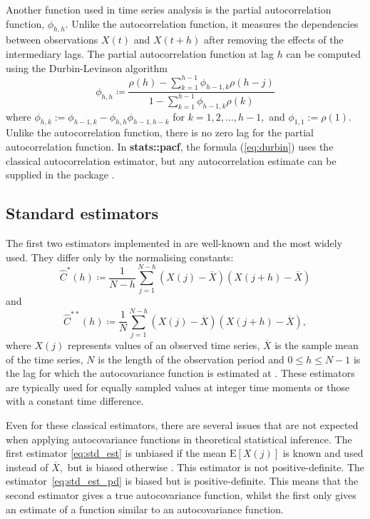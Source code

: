 Another function used in time series analysis is the partial autocorrelation function, \(\phi_{h,h}.\) Unlike the autocorrelation function, it measures the dependencies between observations \(X(t)\) and \(X(t+h)\) after removing the effects of the intermediary lags.
The partial autocorrelation function at lag $h$ can be computed using the Durbin-Levinson algorithm \citep{Durbin1960}
\begin{equation} \label{eq:durbin}
    \phi_{h, h} \coloneq \frac{\rho(h) - \sum_{k=1}^{h-1} \phi_{h - 1, k} \rho(h - j)}{1 - \sum_{k=1}^{h-1} \phi_{h - 1, k} \rho(k)}
\end{equation}
where \(\phi_{h, k} := \phi_{h - 1, k} - \phi_{h, h} \phi_{h - 1, h - k}\) for \(k = 1, 2, \dots, h - 1,\)
and \(\phi_{1, 1} := \rho(1)\). Unlike the autocorrelation function, there is no zero lag for the partial autocorrelation function. In \textbf{stats::pacf}, the formula (\ref{eq:durbin}) uses the classical autocorrelation estimator, but any autocorrelation estimate can be supplied in the package .

\subsection{Standard estimators}
The first two estimators implemented in  are well-known and the most widely used. They differ only by the normalising constants:
\begin{equation} \label{eq:std_est}
\widehat{C}^{*}(h) \coloneq \frac{1}{N-h} \sum_{j=1}^{N - h} \left(X(j) - \overline{X}\right) \left(X(j+h) - \overline{X}\right)
\end{equation}
    and
\begin{equation} \label{eq:std_est_pd}
\widehat{C}^{**}(h) \coloneq \frac{1}{N} \sum_{j=1}^{N - h} \left(X(j) - \overline{X}\right) \left(X(j+h) - \overline{X}\right) ,
\end{equation}
where \(X(j)\) represents values of an observed time series, \(\overline{X}\) is the sample mean of the time series, \(N\) is the length of the observation period and \(0 \leq h \leq N-1\) is the lag for which the autocovariance function is estimated at \citep[Section~3.17]{Yaglom1987}. These estimators are typically used for equally sampled values at integer time moments or those with a constant time difference.

Even for these classical estimators, there are several issues that are not expected when applying autocovariance functions in theoretical statistical inference.
The first estimator \eqref{eq:std_est} is unbiased if the mean \(\text{E}[X(j)]\) is known and used instead of \(\overline{X},\)  but is biased otherwise \citep{Brockwell2016}. This estimator is not positive-definite. The estimator~\eqref{eq:std_est_pd} is biased but is positive-definite. This means that the second estimator gives a true autocovariance function, whilst the first only gives an estimate of a function similar to an autocovariance function. 

